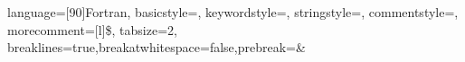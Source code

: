     {language=[90]Fortran,
    basicstyle=\ttfamily\footnotesize,
    keywordstyle=\color{blue}\ttfamily,
    stringstyle=\color{brown}\ttfamily,
    commentstyle=\color{red}\ttfamily,
    morecomment=[l]{\$},
    tabsize=2,
    breaklines=true,breakatwhitespace=false,prebreak=\space\&
  }


\usepackage{graphicx}
\usepackage{subfig}


\usepackage{xmpmulti}

\usepackage{notacion}

\usepackage{def_listas}

\usepackage{pdfpages}

\usepackage{multimedia}

\usepackage{array}  %

\setlength{\tabcolsep}{10pt}
\renewcommand{\arraystretch}{1.5}


\newcommand{\vbs}{\vspace{\baselineskip}}
\newcommand{\vbss}{\vspace{0.5\baselineskip}}
\newcommand{\vbsf}{\vspace*{\baselineskip}}
\newcommand{\vbssf}{\vspace*{0.5\baselineskip}}
\newcommand{\FIGURA}[1]{\vspace*{2\baselineskip} \centering{FIGURA \\ #1} \vspace*{2\baselineskip} } 


\newcommand{\crule}{{\color{cyan} \hrule} }

\setcounter{tocdepth}{4}


\newcommand{\seti}{\setcounter{saveenumi}{\value{enumi}}}
\newcommand{\conti}{\setcounter{enumi}{\value{saveenumi}}}




